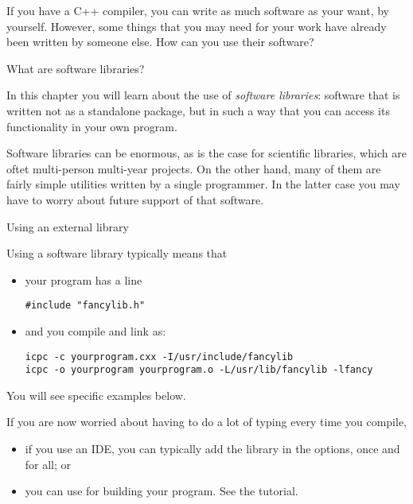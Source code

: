 
If you have a C++ compiler,
you can write as much software as your want, by yourself.
However, some things that you may need for your work
have already been written by someone else.
How can you use their software?

 {What are software libraries?}
\label{sec:makelib}

In this chapter you will learn about the use of
\emph{software libraries}:
software that is written not as a standalone package,
but in such a way that you can access its functionality
in your own program.

Software libraries can be enormous,
as is the case for scientific libraries,
which are oftet multi-person multi-year projects.
On the other hand, many of them
are fairly simple utilities written by a single programmer.
In the latter case you may have to worry about
future support of that software.

 {Using an external library}

Using a software library typically means that
\begin{itemize}
\item your program has a line
\begin{lstlisting}
#include "fancylib.h"
\end{lstlisting}
\item and you compile and link as:
\begin{verbatim}
icpc -c yourprogram.cxx -I/usr/include/fancylib
icpc -o yourprogram yourprogram.o -L/usr/lib/fancylib -lfancy
\end{verbatim}
\end{itemize}
You will see specific examples below.

If you are now worried about having to do a lot of typing every time you compile,
\begin{itemize}
\item if you use an \ac{IDE}, you can typically add the library in the options,
  once and for all; or
\item you can use  for building your program.
  See the tutorial.
\end{itemize}

